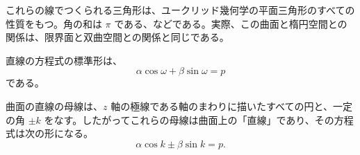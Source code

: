 \begin{description}
これらの線でつくられる三角形は、ユークリッド幾何学の平面三角形のすべての性質をもつ。角の和は $\pi$ である、などである。実際、この曲面と楕円空間との関係は、限界面と双曲空間との関係と同じである。

直線の方程式の標準形は、
\begin{equation*}
\alpha\cos\omega + \beta\sin\omega = p
\end{equation*}
である。

曲面の直線の母線は、$z$ 軸の極線である軸のまわりに描いたすべての円と、一定の角 $\pm k$ をなす。したがってこれらの母線は曲面上の「直線」であり、その方程式は次の形になる。
\begin{equation*}
\alpha\cos k \pm \beta\sin k = p.
\end{equation*}
\end{description}
